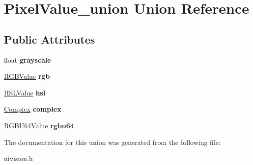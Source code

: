 \hypertarget{unionPixelValue__union}{\section{\-Pixel\-Value\-\_\-union \-Union \-Reference}
\label{unionPixelValue__union}
}
\subsection*{\-Public \-Attributes}
\begin{DoxyCompactItemize}
\item 
\hypertarget{unionPixelValue__union_aacaaa6cde302e77de252d9924b9c69ab}{float {\bfseries grayscale}}\label{unionPixelValue__union_aacaaa6cde302e77de252d9924b9c69ab}

\item 
\hypertarget{unionPixelValue__union_ab6f7394fc48fcc82b8f398055d7cb561}{\hyperlink{structRGBValue__struct}{\-R\-G\-B\-Value} {\bfseries rgb}}\label{unionPixelValue__union_ab6f7394fc48fcc82b8f398055d7cb561}

\item 
\hypertarget{unionPixelValue__union_a250bee75a3db8009e312a4be2e17b1b8}{\hyperlink{structHSLValue__struct}{\-H\-S\-L\-Value} {\bfseries hsl}}\label{unionPixelValue__union_a250bee75a3db8009e312a4be2e17b1b8}

\item 
\hypertarget{unionPixelValue__union_aab44189546d41a8a2dfb12c185bda1c6}{\hyperlink{structComplex__struct}{\-Complex} {\bfseries complex}}\label{unionPixelValue__union_aab44189546d41a8a2dfb12c185bda1c6}

\item 
\hypertarget{unionPixelValue__union_ac7b195a0d42f1c4b5f156304d473e18c}{\hyperlink{structRGBU64Value__struct}{\-R\-G\-B\-U64\-Value} {\bfseries rgbu64}}\label{unionPixelValue__union_ac7b195a0d42f1c4b5f156304d473e18c}

\end{DoxyCompactItemize}


\-The documentation for this union was generated from the following file\-:\begin{DoxyCompactItemize}
\item 
nivision.\-h\end{DoxyCompactItemize}

